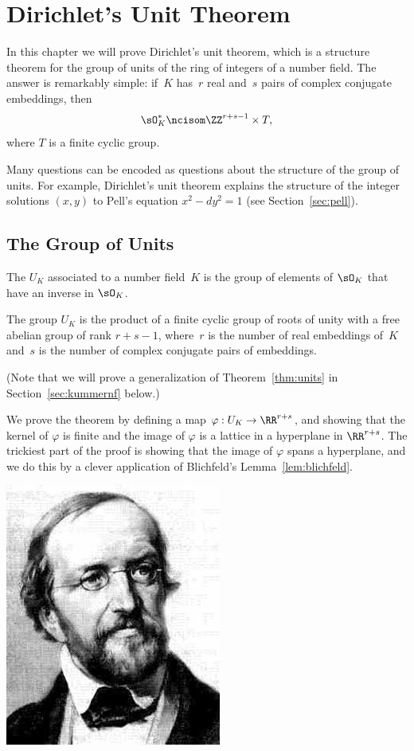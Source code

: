 
\chapter{Dirichlet's Unit Theorem}

In this chapter we will prove Dirichlet's unit theorem, which is a structure
theorem for the group of units of the ring of integers of a number field.
The answer is remarkably simple: if~$K$ has~$r$ real and~$s$ pairs of
complex conjugate embeddings, then
\[
  \sO_K^*\ncisom \ZZ^{r+s-1} \times T,
\]
where $T$ is a finite cyclic group.

Many questions can be encoded as questions about the structure of the
group of units.  For example, Dirichlet's unit theorem explains the
structure of the  integer solutions $(x,y)$ to Pell's equation $x^2-dy^2=1$
(see Section~\ref{sec:pell}).

\section{The Group of Units}

\begin{definition}
	The  $U_K$ associated to a number field~$K$ is
	the group of elements of $\sO_K$ that have an inverse in $\sO_K$.
\end{definition}

\begin{theorem}[Dirichlet]\label{thm:units}
	The group $U_K$ is the product of a finite cyclic group of roots of
	unity with a free abelian group of rank $r+s-1$, where~$r$ is the
	number of real embeddings of~$K$ and~$s$ is the number of complex
	conjugate pairs of embeddings.
\end{theorem}
(Note that we will prove a generalization of Theorem~\ref{thm:units} in
Section~\ref{sec:kummernf} below.)

We prove the theorem by defining a map $\varphi:U_K \to \RR^{r+s}$, and
showing that the kernel of $\varphi$ is finite and the image of $\varphi$
is a lattice in a hyperplane in $\RR^{r+s}$.  The trickiest part of the
proof is showing that the image of $\varphi$ spans a hyperplane, and we
do this by a clever application of Blichfeld's Lemma~\ref{lem:blichfeld}.

\begin{center}
	\includegraphics[width=.3\textwidth]{img/dirichlet}
\end{center}

